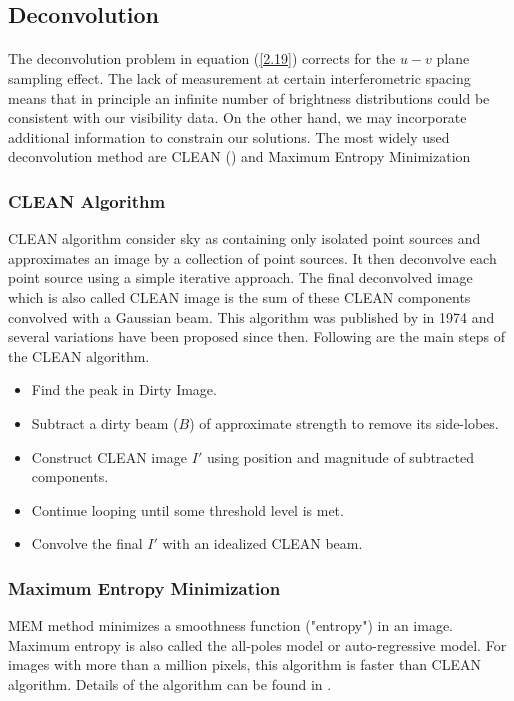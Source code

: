 \subsection{Deconvolution}
\label{s:radio_deconvolve}

\paragraph{}The deconvolution problem in equation (\ref{2.19}) corrects for the $u-v$
plane sampling effect. The lack of measurement at certain interferometric spacing means 
that in principle an infinite number of brightness distributions could be consistent with
our visibility data. On the other hand, we may incorporate additional information to constrain
our solutions. The most widely used deconvolution method are CLEAN (\cite{hogbom}) and Maximum
Entropy Minimization

\subsubsection{CLEAN Algorithm}
CLEAN algorithm consider sky as containing only isolated point sources and approximates an image by a collection of point sources.
It then deconvolve each point source using a simple iterative approach. The final deconvolved image which is also called CLEAN image 
is the sum of these CLEAN components convolved with a Gaussian beam. This algorithm was published by \cite{hogbom} in 1974 and several 
variations have been proposed since then. Following are the main steps of the CLEAN algorithm.
\begin{itemize}
 \item Find the peak in Dirty Image.
 \item Subtract a dirty beam ($B$) of approximate strength to remove its side-lobes.
 \item Construct CLEAN image $I'$ using position and magnitude of subtracted components.
 \item Continue looping until some threshold level is met.
 \item Convolve the final $I'$ with an idealized CLEAN beam.
\end{itemize}

\subsubsection{Maximum Entropy Minimization}

MEM method minimizes a smoothness function ("entropy") in an image.
Maximum entropy is also called the all-poles model or auto-regressive model.
For images with more than a million pixels, this algorithm is faster than CLEAN 
algorithm. Details of the algorithm can be found in \cite{}.

